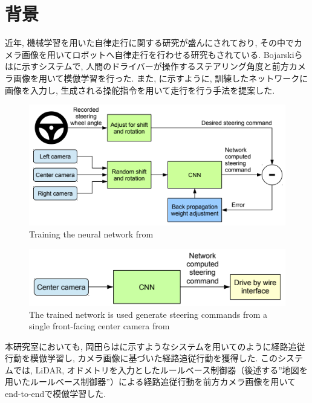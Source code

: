 
\section{背景}
近年, 機械学習を用いた自律走行に関する研究が盛んにされており, その中でカメラ画像を用いてロボットへ自律走行を行わせる研究もされている. Bojarskiら\cite{bojarski}はに示すシステムで, 人間のドライバーが操作するステアリング角度と前方カメラ画像を用いて模倣学習を行った. また, に示すように, 訓練したネットワークに画像を入力し, 生成される操舵指令を用いて走行を行う手法を提案した.

\vspace{0.5cm}

\begin{figure}[hbtp]
  \centering
 \includegraphics[keepaspectratio, scale=0.9]
      {images/bojarski_train.png}
 \caption{Training the neural network from \cite{bojarski}}
 \label{Fig:bojarski_train}
\end{figure}

\begin{figure}[hbtp]
     \centering
    \includegraphics[keepaspectratio, scale=0.7]
         {images/bojarski_test.png}
    \caption{The trained network is used generate steering commands from a single front-facing center camera from \cite{bojarski}}
    \label{Fig:bojarski_test}
\end{figure}

\newpage

本研究室においても, 岡田ら\cite{okada1}\cite{okada2}はに示すようなシステムを用いてのように経路追従行動を模倣学習し, カメラ画像に基づいた経路追従行動を獲得した. このシステムでは, LiDAR, オドメトリを入力としたルールベース制御器（後述する”地図を用いたルールベース制御器”）による経路追従行動を前方カメラ画像を用いてend-to-endで模倣学習した. 

